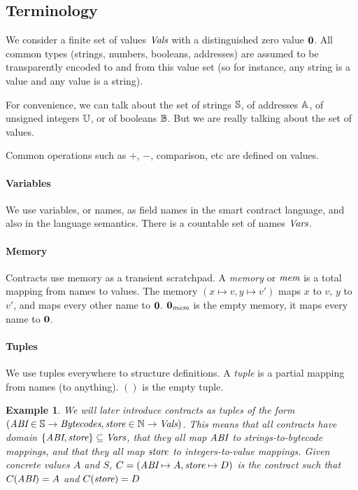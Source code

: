 \documentclass[12pt]{extarticle}
\newtheorem{example}{Example}
\begin{document}
\subsection{Terminology}
We consider a finite set of values $\textit{Vals}$ with a distinguished zero value $\mathbf{0}$. All common types (strings, numbers, booleans, addresses) are assumed to be transparently encoded to and from this value set (so for instance, any string is a value and any value is a string).

For convenience, we can talk about the set of strings $\mathbb{S}$, of addresses $\mathbb{A}$, of unsigned integers $\mathbb{U}$, or of booleans $\mathbb{B}$. But we are really talking about the set of values.

Common operations such as $+$, $-$, comparison, etc are defined on values.

\paragraph{Variables}
We use variables, or names, as field names in the smart contract language, and also in the language semantics. There is a countable set of names $\textit{Vars}$. 

\paragraph{Memory}
Contracts use memory as a transient scratchpad.
A \emph{memory} or $\textit{mem}$ is a total mapping from names to values. The memory $(x\mapsto v,y\mapsto v')$ maps $x$ to $v$, $y$ to $v'$, and maps every other name to $\mathbf{0}$. $\mathbf{0}_{\textit{mem}}$ is the empty memory, it maps every name to $\mathbf{0}$.

\paragraph{Tuples}
We use tuples everywhere to structure definitions. A \emph{tuple} is a partial mapping from names (to anything). $()$ is the empty tuple.

\begin{example}
We will later introduce \emph{contracts} as tuples of the form $(\textit{ABI}\in\mathbb{S}\rightarrow\textit{Bytecodes},\textit{store}\in\mathbb{N}\rightarrow\textit{Vals})$. 
This means that all contracts have domain $\left\{\textit{ABI},\textit{store}\right\}\subseteq\textit{Vars}$, that they all map $\textit{ABI}$ to strings-to-bytecode mappings, and that they all map $\textit{store}$ to integers-to-value mappings.
Given concrete values $A$ and $S$, $C = (\textit{ABI}\mapsto A,\textit{store}\mapsto D)$ is the contract such that $C(\textit{ABI}) = A$ and $C(\textit{store}) = D$
\end{example}
\end{document}
